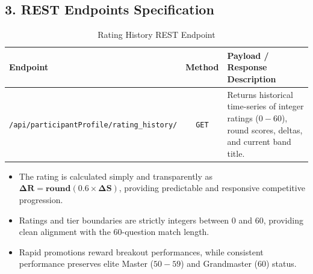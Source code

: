 \subsection{3. REST Endpoints Specification}
\begin{table}[htbp]
\centering
\small
\begin{tabular}{|p{6.2cm}|c|p{7.5cm}|}
\hline
\rowcolor{primaryBlue!15}
\textbf{Endpoint} & \textbf{Method} & \textbf{Payload / Response Description} \\ \hline
\texttt{/api/participantProfile/}\newline\texttt{rating\_history/} & \texttt{GET} & Returns historical time-series of integer ratings ($0-60$), round scores, deltas, and current band title. \\ \hline
\end{tabular}
\caption{Rating History REST Endpoint}
\end{table}

\begin{tcolorbox}[summarybox, title={Chapter Key Takeaways}]
\begin{itemize}
    \item The rating is calculated simply and transparently as \textbf{$\mathbf{\Delta R = \text{round}(0.6 \times \Delta S)}$}, providing predictable and responsive competitive progression.
    \item Ratings and tier boundaries are strictly integers between $0$ and $60$, providing clean alignment with the 60-question match length.
    \item Rapid promotions reward breakout performances, while consistent performance preserves elite Master ($50-59$) and Grandmaster ($60$) status.
\end{itemize}
\end{tcolorbox}
